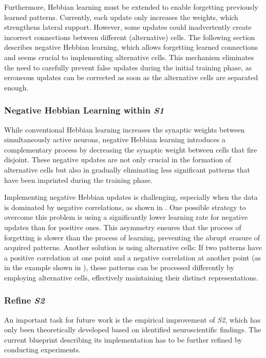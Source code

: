Furthermore, Hebbian learning  must be extended to enable forgetting previously learned patterns.
Currently, each update only increases the weights, which strengthens lateral support.
However, some updates could inadvertently create incorrect connections between different (alternative) cells.
The following section describes negative Hebbian learning, which allows forgetting learned connections and seems crucial to implementing alternative cells.
This mechanism eliminates the need to carefully prevent false updates during the initial training phase, as erroneous updates can be corrected as soon as the alternative cells are separated enough.

\subsubsection{Negative Hebbian Learning within \emph{S1}}
While conventional Hebbian learning \cite{hebb_organization_1949} increases the synaptic weights between simultaneously active neurons, negative Hebbian learning introduces a complementary process by decreasing the synaptic weight between cells that fire disjoint.
These negative updates are not only crucial in the formation of alternative cells but also in gradually eliminating less significant patterns that have been imprinted during the training phase.

Implementing negative Hebbian updates is challenging, especially when the data is dominated by negative correlations, as shown in .
One possible strategy to overcome this problem is using a significantly lower learning rate for negative updates than for positive ones.
This asymmetry ensures that the process of forgetting is slower than the process of learning, preventing the abrupt erasure of acquired patterns.
Another solution is using alternative cells: If two patterns have a positive correlation at one point and a negative correlation at another point (as in the example shown in ), these patterns can be processed differently by employing alternative cells, effectively maintaining their distinct representations.


\subsubsection{Refine \emph{S2}}
An important task for future work is the empirical improvement of \emph{S2}, which has only been theoretically developed based on identified neuroscientific findings. The current blueprint describing its implementation has to be further refined by conducting experiments.

